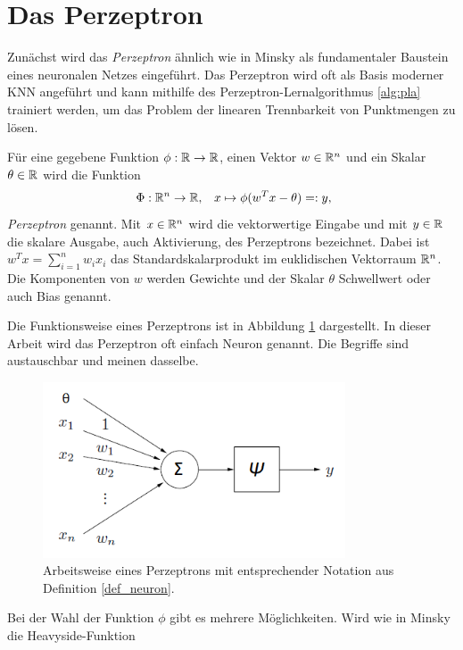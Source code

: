 \section{Das Perzeptron}
\label{perzeptron_abs}
Zunächst wird das \textit{Perzeptron} ähnlich wie in Minsky \cite{minsky2017perceptrons} als fundamentaler Baustein eines neuronalen Netzes eingeführt. Das Perzeptron wird oft als Basis moderner KNN angeführt und kann mithilfe des Perzeptron-Lernalgorithmus \ref{alg:pla} trainiert werden, um das Problem der linearen Trennbarkeit von Punktmengen zu lösen.
\begin{defi}[Perzeptron]
    \label{def_neuron}
    Für eine gegebene Funktion $\phi: \mathbb{R} \rightarrow \mathbb{R}$, einen Vektor $w \in \mathbb{R}^{n}$ und ein Skalar $\theta \in \mathbb{R}$ wird die Funktion 
    \[ \
    \Phi: \mathbb{R}^n \rightarrow \mathbb{R}, \; \; \; x \mapsto \phi(w^T x -\theta)=:y,
    \]
    \textit{Perzeptron} genannt. Mit $x \in \mathbb{R}^{n}$ wird die vektorwertige Eingabe und mit $y \in \mathbb{R}$ die skalare Ausgabe, auch Aktivierung, des Perzeptrons bezeichnet. Dabei ist $w^Tx=\sum_{i=1}^n w_i x_i$ das Standardskalarprodukt im euklidischen Vektorraum $\mathbb{R}^{n}$. Die Komponenten von $w$ werden Gewichte und der Skalar $\theta$ Schwellwert oder auch Bias genannt.
\end{defi}
Die Funktionsweise eines Perzeptrons ist in Abbildung \ref{funktionsweise_neuron} dargestellt. In dieser Arbeit wird das Perzeptron oft einfach Neuron genannt. Die Begriffe sind austauschbar und meinen dasselbe.
\begin{figure}[h]
    \includegraphics[width=0.8\textwidth]{pics/chapter_neuralnetworks/perzeptron.png}
    \centering
    \caption[Arbeitsweise eines Perzeptrons]{Arbeitsweise eines Perzeptrons mit entsprechender Notation aus Definition \ref{def_neuron}.}
    \label{funktionsweise_neuron}
\end{figure}
Bei der Wahl der Funktion $\phi$ gibt es mehrere Möglichkeiten. Wird wie in Minsky \cite{minsky2017perceptrons} die Heavyside-Funktion
